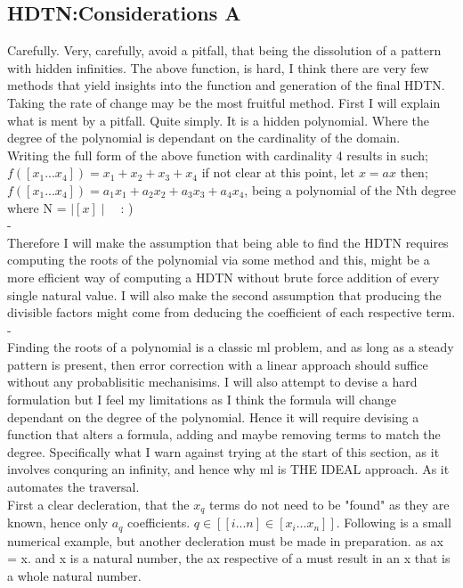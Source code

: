 \documentclass{article}
\begin{document}
\subsection{HDTN:Considerations A}
Carefully. Very, carefully, avoid a pitfall, that being the dissolution of a pattern with hidden infinities.
The above function, is hard, I think there are very few methods that yield insights into the function and generation
of the final HDTN. Taking the rate of change may be the most fruitful method. First I will explain what is ment by a pitfall.
Quite simply. It is a hidden polynomial. Where the degree of the polynomial is dependant on the cardinality of the domain.\\
Writing the full form of the above function with cardinality 4 results in such;\\
$f([x_1...x_4])=x_1+x_2+x_3+x_4$ if not clear at this point, let $x = ax$ then;\\
$f([x_1...x_4])=a_1x_1+a_2x_2+a_3x_3+a_4x_4$, being a polynomial of the Nth degree where N = $\mid[x]\mid$\ \ : )\\
{\color{white}-}\\
Therefore I will make the assumption that being able to find the HDTN requires computing the roots of the polynomial via some method
and this, might be a more efficient way of computing a HDTN without brute force addition of every single natural value. I will also
make the second assumption that producing the divisible factors might come from deducing the coefficient of each respective term.\\
{\color{white}-}\\
Finding the roots of a polynomial is a classic ml problem, and as long as a steady pattern is present, then error correction with
a linear approach should suffice without any probablisitic mechanisims. I will also attempt to devise a hard formulation but I feel
my limitations as I think the formula will change dependant on the degree of the polynomial. Hence it will require devising a
function that alters a formula, adding and maybe removing terms to match the degree. Specifically what I warn against trying at the 
start of this section, as it involves conquring an infinity, and hence why ml is THE IDEAL approach. As it automates the traversal.
\\
First a clear decleration, that the $x_q$ terms do not need to be "found" as they are known, hence only $a_q$ coefficients.
$q \in [[i...n]\in[x_i...x_n]]$. Following is a small numerical example, but another decleration must be made in preparation. as ax = x.
and x is a natural number, the ax respective of a must result in an x that is a whole natural number.
\end{document}
